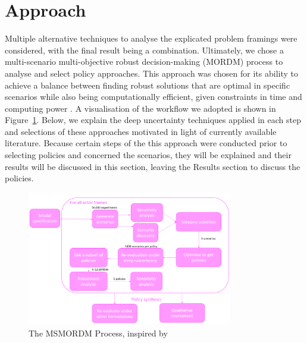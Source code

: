 \section{Approach}
\label{s:approach}


Multiple alternative techniques to analyse the explicated problem framings were considered, with the final result being a combination. Ultimately, we chose a multi-scenario multi-objective robust decision-making (MORDM) process to analyse and select policy approaches. This approach was chosen for its ability to achieve a balance between finding robust solutions that are optimal in specific scenarios while also being computationally efficient, given constraints in time and computing power \parencite{bartholomew_considering_2020}. A visualisation of the workflow we adopted is shown in Figure~\ref{fig:msmordm}. Below, we explain the deep uncertainty techniques applied in each step and selections of these approaches motivated in light of currently available literature. Because certain steps of the this approach were conducted prior to selecting policies and concerned the scenarios, they will be explained and their results will be discussed in this section, leaving the Results section to discuss the policies. 

\begin{figure}[h]
    \centering
    \includegraphics[width=0.8\textwidth]{report/figures/methodology.png}
    \caption{The MSMORDM Process, inspired by  \citeauthor{bartholomew_considering_2020}}
    \label{fig:msmordm}
\end{figure}

